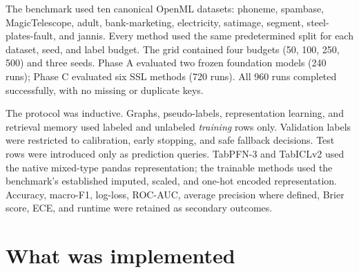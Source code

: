 \documentclass[10pt]{article}
\begin{document}
The benchmark used ten canonical OpenML datasets: phoneme, spambase,
MagicTelescope, adult, bank-marketing, electricity, satimage, segment,
steel-plates-fault, and jannis. Every method used the same predetermined split
for each dataset, seed, and label budget. The grid contained four budgets
(50, 100, 250, 500) and three seeds. Phase A evaluated two frozen foundation
models (240 runs); Phase C evaluated six SSL methods (720 runs). All 960 runs
completed successfully, with no missing or duplicate keys.

The protocol was inductive. Graphs, pseudo-labels, representation learning, and
retrieval memory used labeled and unlabeled \emph{training} rows only.
Validation labels were restricted to calibration, early stopping, and safe
fallback decisions. Test rows were introduced only as prediction queries.
TabPFN-3 and TabICLv2 used the native mixed-type pandas representation; the
trainable methods used the benchmark's established imputed, scaled, and
one-hot encoded representation. Accuracy, macro-F1, log-loss, ROC-AUC,
average precision where defined, Brier score, ECE, and runtime were retained
as secondary outcomes.

\section{What was implemented}
\end{document}
